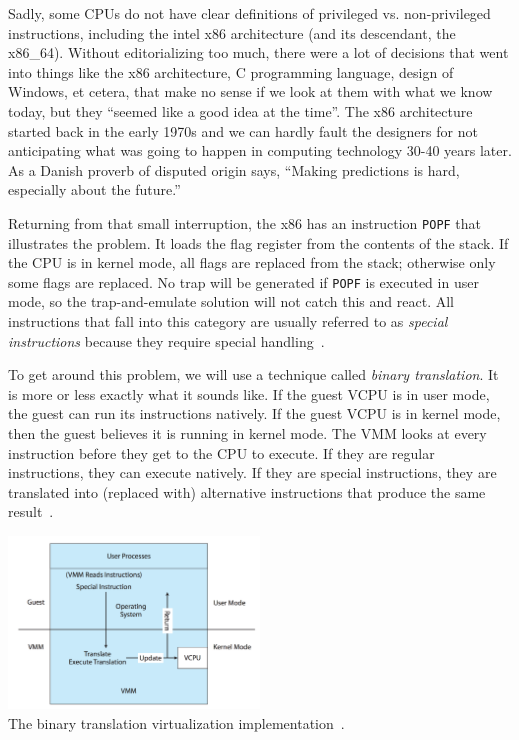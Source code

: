 Sadly, some CPUs do not have clear definitions of privileged vs. non-privileged instructions, including the intel x86 architecture (and its descendant, the x86\_64). Without editorializing too much, there were a lot of decisions that went into things like the x86 architecture, C programming language, design of Windows, et cetera, that make no sense if we look at them with what we know today, but they ``seemed like a good idea at the time''. The x86 architecture started back in the early 1970s and we can hardly fault the designers for not anticipating what was going to happen in computing technology 30-40 years later. As a Danish proverb of disputed origin says, ``Making predictions is hard, especially about the future.''

Returning from that small interruption, the x86 has an instruction \texttt{POPF} that illustrates the problem. It loads the flag register from the contents of the stack. If the CPU is in kernel mode, all flags are replaced from the stack; otherwise only some flags are replaced. No trap will be generated if \texttt{POPF} is executed in user mode, so the trap-and-emulate solution will not catch this and react. All instructions that fall into this category are usually referred to as \textit{special instructions} because they require special handling~\cite{osc}.

To get around this problem, we will use a technique called \textit{binary translation}. It is more or less exactly what it sounds like. If the guest VCPU is in user mode, the guest can run its instructions natively. If the guest VCPU is in kernel mode, then the guest believes it is running in kernel mode. The VMM looks at every instruction before they get to the CPU to execute. If they are regular instructions, they can execute natively. If they are special instructions, they are translated into (replaced with) alternative instructions that produce the same result~\cite{osc}.

\begin{center}
	\includegraphics[width=0.5\textwidth]{images/binary-translation.png}\\
	The binary translation virtualization implementation~\cite{osc}.
\end{center}

